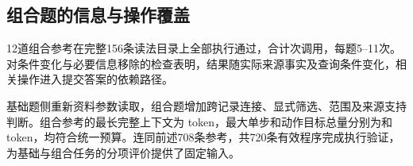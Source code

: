 \subsection{组合题的信息与操作覆盖}
\label{sec:composition-validation}

12道组合参考在完整156条读法目录上全部执行通过，合计\CompositionCalls{}次调用，每题5--11次。对条件变化与必要信息移除的检查表明，结果随实际来源事实及查询条件变化，相关操作进入提交答案的依赖路径。

\begin{table}[htbp]
\centering\small
\caption{基础与组合评价参考的操作覆盖（题数）}
\label{tab:composition-operations}
\CompositionOperationTable
\end{table}

基础题侧重新资料参数读取，组合题增加跨记录连接、显式筛选、范围及来源支持判断。组合参考的最长完整上下文为\CompositionMaxContext{} token，最大单步和动作目标总量分别为\CompositionMaxAction{}和\CompositionMaxTargets{} token，均符合统一预算。连同前述708条参考，共720条有效程序完成执行验证，为基础与组合任务的分项评价提供了固定输入。
